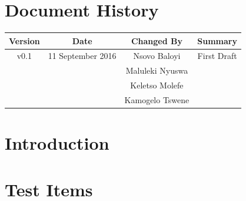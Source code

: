 \documentclass[a4paper,12pt]{article}
\begin{document}
	\newpage
	
	\tableofcontents
	\newpage
	
	
	\section*{Document History}
	
	\begin{table}[h!]
		
		\centering %
		\begin{tabular}{c c c c} %
			\hline\hline %
			Version & Date & Changed By & Summary \\ [0.5ex] %
			\hline %
			v0.1 & 11 September 2016 & Nsovo Baloyi & First Draft 
			\\ & & Maluleki Nyuswa &  
			\\ & & Keletso Molefe &
			\\ & & Kamogelo Tswene & \\ [1ex] 
			\hline
		\end{tabular}
		\label{table:nonlin} %
	\end{table}

	\newpage
	
	\section{Introduction}	
	
	
	
	
	\section{Test Items}	
		
	
	
	
\end{document}

